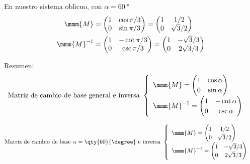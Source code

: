 En nuestro sistema oblicuo, con $\alpha = \qty{60}{\degree}$
\begin{align*}
  \mmm{M}
  &=
    \begin{pmatrix}
      1 & \cos\pi/3\\
      0 & \sin\pi/3
    \end{pmatrix}
    = \begin{pmatrix}
      1 & 1/2\\
      0 & \sqrt{3}/2
    \end{pmatrix}\\
  \mmm{M}^{-1}
  &=
    \begin{pmatrix}
      1 & -\cot\pi/3\\
      0 & \csc\pi/3
    \end{pmatrix}
    = \begin{pmatrix}
      1 & -\sqrt{3}/3\\
      0 & 2\sqrt{3}/3
    \end{pmatrix}
\end{align*}

Resumen:
\[
  \text{Matriz de cambio de base general e inversa }
  \begin{cases}
    \begin{array}{l}
      \mmm{M}
      = \begin{pmatrix}
        1 & \cos\alpha\\
        0 & \sin\alpha
      \end{pmatrix}\\
      \mmm{M}^{-1}
      = \begin{pmatrix}
        1 & -\cot\alpha\\
        0 & \csc\alpha
      \end{pmatrix}      
    \end{array}
  \end{cases}
\]

\[
  \text{Matriz de cambio de base $\alpha=\qty{60}{\degree}$ e inversa }
  \begin{cases}
    \begin{array}{l}
      \mmm{M}
      = \begin{pmatrix}
        1 & 1/2\\
        0 & \sqrt{3}/2
      \end{pmatrix}\\
      \mmm{M}^{-1}
      = \begin{pmatrix}
        1 & -\sqrt{3}/3\\
        0 & 2\sqrt{3}/3
      \end{pmatrix}      
    \end{array}
  \end{cases}
\]

